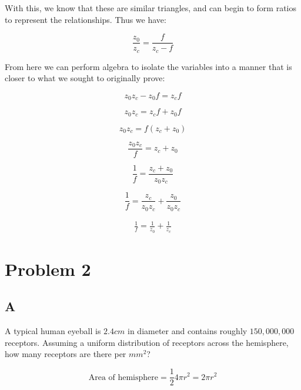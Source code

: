 \documentclass{article}
\begin{document}
With this, we know that these are similar triangles, and can begin to form ratios to represent the relationships. Thus we have:

\begin{equation}
    \frac{z_0}{z_c} = \frac{f}{z_c - f}
\end{equation}

From here we can perform algebra to isolate the variables into a manner that is closer to what we sought to originally prove:

\begin{equation}
    z_0 z_c - z_0 f = z_c f
\end{equation}

\begin {equation}
    z_0 z_c = z_c f + z_0 f
\end{equation}

\begin{equation}
    z_0 z_c = f (z_c + z_0)
\end{equation}

\begin{equation}
    \frac{z_0 z_c}{f} = z_c + z_0
\end{equation}

\begin {equation}
    \frac{1}{f} = \frac{z_c + z_0}{z_0 z_c}
\end{equation}

\begin{equation}
    \frac{1}{f} = \frac{z_c}{z_0 z_c} + \frac{z_0}{z_0 z_c}
\end{equation}

\begin{eqnarray}
    \frac{1}{f} = \frac{1}{z_0} + \frac{1}{z_c}
\end{eqnarray}

\section*{Problem 2}

\subsection*{A}
A typical human eyeball is $2.4cm$ in diameter and contains roughly $150,000,000$ receptors. Assuming a uniform distribution of receptors across the hemisphere, how many receptors are there per $mm^2$?

\begin{equation}
    \text{Area of hemisphere} = \frac{1}{2}4\pi r^2 = 2\pi r ^2
\end{equation}
\end{document}
